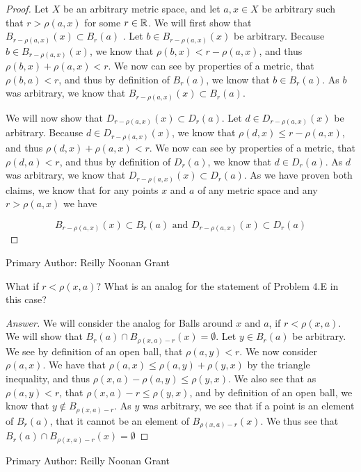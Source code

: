 \begin{proof}
  Let $X$ be an arbitrary metric space, and let $a,x\in X$ be
  arbitrary such that $r
  > \rho(a,x)$ for some $r\in \mathbb{R}$.  We will first show that 
  $B_{r-\rho(a,x)}(x) \subset B_r(a)$ . Let $b \in B_{r-\rho(a,x)}(x)$
  be arbitrary. Because $b \in B_{r-\rho(a,x)}(x)$, we know that
  $\rho(b,x) < r- \rho(a,x)$, and thus   $\rho(b,x) + \rho(a,x)<
  r$. We now can see by properties of a metric, that $\rho(b,a)<r$,
  and thus by definition of $B_r(a)$, we know that $b \in B_r(a)$. As
  $b$ was arbitrary, we know that $B_{r-\rho(a,x)}(x) \subset B_r(a)$.

  We will now show that $D_{r-\rho(a,x)}(x) \subset D_r(a)$. Let $d 
  \in D_{r-\rho(a,x)}(x)$ be arbitrary. Because $d \in D_{r-\rho(a,x)}(x)$, we know that
  $\rho(d,x) \leq r- \rho(a,x)$, and thus   $\rho(d,x) + \rho(a,x)<
  r$. We now can see by properties of a metric, that $\rho(d,a)<r$,
  and thus by definition of $D_r(a)$, we know that $d \in D_r(a)$. As
  $d$ was arbitrary, we know that $D_{r-\rho(a,x)}(x) \subset
  D_r(a)$. As we have proven both claims, we know that for any points
  $x$ and $a$ of any metric space and any $r 
  > \rho(a,x)$ we have

  $$B_{r-\rho(a,x)}(x) \subset B_r(a) \text{  and  }
  D_{r-\rho(a,x)}(x) \subset D_r(a)$$
\end{proof}
Primary Author: Reilly Noonan Grant

\begin{minorEx}%
    What if $r < \rho(x,a)$? What is an analog for the statement of Problem 4.E
    in this case?
\end{minorEx}

\begin{proof}[Answer]
  We will consider the analog for Balls around $x$ and $a$, if $r<
  \rho(x,a)$. We will show that $B_r(a) \cap B_{\rho(x,a)-r}(x) =
  \emptyset$. Let $y\in B_{r}(a)$ be arbitrary. We see by
  definition of an open ball, that $\rho(a,y) < r$. 
  We now consider $\rho(a,x)$. We have that 
  $\rho(a,x) \leq \rho(a,y) + \rho(y,x)$ by the triangle inequality,
  and thus $\rho(x,a) - \rho(a,y) \leq\rho(y,x)$. We also see that as
  $\rho(a,y) < r$, that $\rho(x,a) - r \leq\rho(y,x)$, and by
  definition of an open ball, we know that $y \notin B_{\rho(x,a)-r}$.
  As $y$ was arbitrary, we see that if a point is an element of
  $B_r(a)$, that it cannot be an element of $B_{\rho(x,a)-r}(x)$. We
  thus see that $B_r(a) \cap B_{\rho(x,a)-r}(x) = \emptyset$
\end{proof}

Primary Author: Reilly Noonan Grant